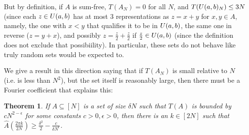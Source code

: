\documentclass{article}
\newtheorem{theorem}{Theorem}[section]
\theoremstyle{definition}
\theoremstyle{remark}
\numberwithin{equation}{section}
\begin{document}
But by definition, if $A$ is sum-free, $T(A_N) = 0$ for all $N$, and
$T(U(a,b)_N) \leq 3N$ (since each $z \in U(a,b)$ has at most 3
representations as $z = x+y$ for $x,y \in A$, namely, the one with
$x < y$ that qualifies it to be in $U(a,b)$, the same one in
reverse ($z = y+x$), and possibly $z = \frac{z}{2} + \frac{z}{2}$ if
$\frac{z}{2} \in U(a,b)$ (since the definition does not exclude
that possibiility).  In particular, these sets do not behave like
truly random sets would be expected to.  

We give a result in this direction saying that if $T(A_N)$ is small
relative to $N$ (i.e. is less than $N^2$), but the set itself is
reasonably large, then there must be a Fourier coefficient that
explains this: 

\begin{theorem}\label{thm:alpha_finitary}
  If $A \subseteq [N]$ is a set of size $\delta N$ such that $T(A)$ is
  bounded by $c N^{2-\epsilon}$ for some constants
  $c > 0, \epsilon > 0$, then there is an $k \in [2N]$ such that
  $\widehat{A}(\frac{2\pi k}{2N}) \geq \frac{\delta^2}{2} - \frac{c}{\delta
    N^\epsilon}$.
\end{theorem}
\end{document}
